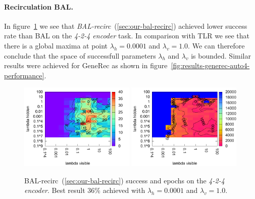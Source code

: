 \paragraph{Recirculation BAL.} 
In figure~\ref{fig:results-bal-recirc-auto4-performance} we see that \emph{BAL-recirc}~(\ref{sec:our-bal-recirc}) achieved lower success rate than BAL on the \emph{4-2-4 encoder} task. In comparison with TLR we see that there is a global maxima at point $\lambda_h = 0.0001$ and $\lambda_v=1.0$. We can therefore conclude that the space of successfull parameters $\lambda_h$ and $\lambda_v$ is bounded. Similar results were achieved for GeneRec as shown in figure~\ref{fig:results-generec-auto4-performance}.
\begin{figure}[H]
  \centering
  \includegraphics[width=0.49\textwidth]{img/bal-recirc-auto4-success.pdf}   
  \includegraphics[width=0.49\textwidth]{img/bal-recirc-auto4-epoch.pdf}     
  \caption{BAL-recirc~(\ref{sec:our-bal-recirc}) success and epochs on the \emph{4-2-4 encoder}. Best result $36\%$ achieved with $\lambda_h = 0.0001$ and $\lambda_v=1.0$.}
  \label{fig:results-bal-recirc-auto4-performance}
\end{figure}


